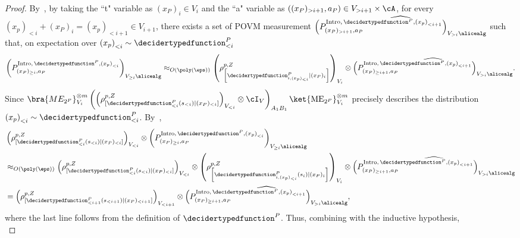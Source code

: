 \begin{proof}
	By~, by taking the ``t" variable as $(x_P)_{i} \in V_i$ and the ``a" variable as $\left( (x_P)_{> i+1}, a_P \right) \in V_{> i+1} \times \cA $, for every $\left(x_p\right)_{< i} + (x_P)_{i} = \left(x_p\right)_{< i+1} \in V_{i+1}$, there exists a set of POVM measurement $\widehat{\left(P^{\text{Intro}, \, \decidertypedfunction^P, \left(x_p\right)_{< i+1}}_{ (x_P)_{> i+1}, a_P } \right)_{V_{> i} \alicealg}}$ such that, on expectation over $\left(x_p\right)_{< i} \sim \decidertypedfunction^P_{< i}$
	\begin{equation*}
		\left(P^{\text{Intro}, \, \decidertypedfunction^P, \left(x_p\right)_{< i}}_{(x_P)_{\geq i}, a_P} \right)_{V_{\geq i} \alicealg} 	\approx_{O(\poly(\eps))}   \left(\rho_{\left[\decidertypedfunction_{i, (x_p)_{< i}}^{P} | (x_P)_i \right]}^{p, Z}\right)_{V_i} \otimes \widehat{\left(P^{\text{Intro}, \, \decidertypedfunction^P, \left(x_p\right)_{< i+1}}_{ (x_P)_{\geq i+1}, a_P } \right)_{V_{> i} \alicealg}}. 
	\end{equation*}
	Since $\bra{ME_{2^P}}^{\otimes m}_{V_i} \left(\left(\rho^{p,Z}_{[\decidertypedfunction^P_{< i}(s_{< i})|(x_P)_{< i} ]}\right)_{V_{< i}} \otimes \cI_V \right)_{A_1 B_1} \ket{\text{ME}_{2^P}}^{\otimes m}_{V_i} $ precisely describes the distribution $\left(x_p\right)_{< i}\sim \decidertypedfunction^P_{< i}$. By~, 
	\begin{align*}
		&\left(\rho^{p,Z}_{[\decidertypedfunction^P_{< i}(s_{< i})|(x_P)_{< i} ]}\right)_{V_{< i}} \otimes \left(P^{\text{Intro}, \, \decidertypedfunction^P, \left(x_p\right)_{< i}}_{(x_P)_{\geq i}, a_P} \right)_{V_{\geq i} \alicealg} \\
		&\approx_{O(\poly(\eps))}   \left(\rho^{p,Z}_{[\decidertypedfunction^P_{< i}(s_{< i})|(x_P)_{< i} ]}\right)_{V_{< i}} \otimes \left(\rho_{\left[\decidertypedfunction_{i, (x_p)_{< i}}^{P} (s_i)| (x_P)_i \right]}^{p, Z}\right)_{V_i} \otimes \widehat{\left(P^{\text{Intro}, \, \decidertypedfunction^P, \left(x_p\right)_{< i+1}}_{ (x_P)_{\geq i+1}, a_P } \right)_{V_{> i} \alicealg}} \\
		&= \left(\rho^{p,Z}_{[\decidertypedfunction^P_{< i+1}(s_{< i+1})|(x_P)_{< i+1} ]}\right)_{V_{< i+1}} \otimes \widehat{\left(P^{\text{Intro}, \, \decidertypedfunction^P, \left(x_p\right)_{< i+1}}_{ (x_P)_{\geq i+1}, a_P } \right)_{V_{> i} \alicealg}},
	\end{align*}
	where the last line follows from the definition of $\decidertypedfunction^P$. Thus, combining with the inductive hypothesis, 
	\begin{equation} 	\label{eq:ARproofdecompIntro-4}

\end{equation}
\end{proof}
